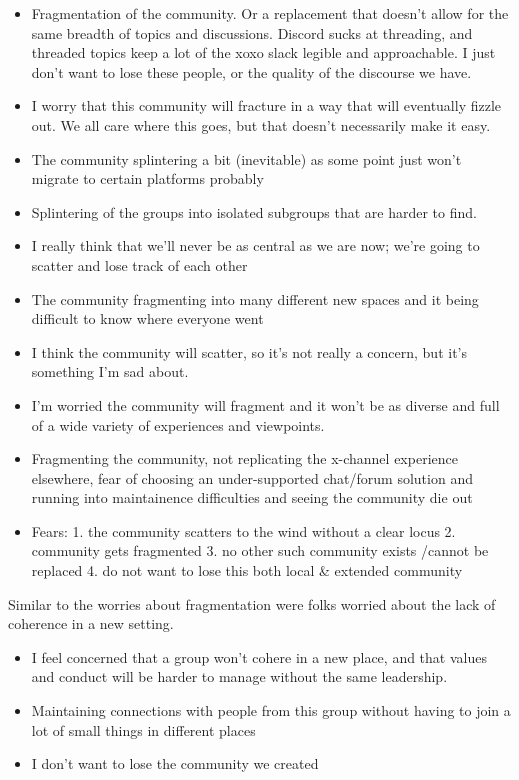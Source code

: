 \documentclass[
]{book}
\providecommand{\tightlist}{%
  \setlength{\itemsep}{0pt}\setlength{\parskip}{0pt}}
\begin{document}
\begin{itemize}
\tightlist
\item
  Fragmentation of the community. Or a replacement that doesn't allow for the same breadth of topics and discussions. Discord sucks at threading, and threaded topics keep a lot of the xoxo slack legible and approachable. I just don't want to lose these people, or the quality of the discourse we have.
\item
  I worry that this community will fracture in a way that will eventually fizzle out. We all care where this goes, but that doesn't necessarily make it easy.
\item
  The community splintering a bit (inevitable) as some point just won't migrate to certain platforms probably
\item
  Splintering of the groups into isolated subgroups that are harder to find.
\item
  I really think that we'll never be as central as we are now; we're going to scatter and lose track of each other
\item
  The community fragmenting into many different new spaces and it being difficult to know where everyone went
\item
  I think the community will scatter, so it's not really a concern, but it's something I'm sad about.
\item
  I'm worried the community will fragment and it won't be as diverse and full of a wide variety of experiences and viewpoints.
\item
  Fragmenting the community, not replicating the x-channel experience elsewhere, fear of choosing an under-supported chat/forum solution and running into maintainence difficulties and seeing the community die out
\item
  Fears: 1. the community scatters to the wind without a clear locus 2. community gets fragmented 3. no other such community exists /cannot be replaced 4. do not want to lose this both local \& extended community
\end{itemize}

Similar to the worries about fragmentation were folks worried about the lack of coherence in a new setting.

\begin{itemize}
\tightlist
\item
  I feel concerned that a group won't cohere in a new place, and that values and conduct will be harder to manage without the same leadership.
\item
  Maintaining connections with people from this group without having to join a lot of small things in different places
\item
  I don't want to lose the community we created
\end{itemize}
\end{document}
